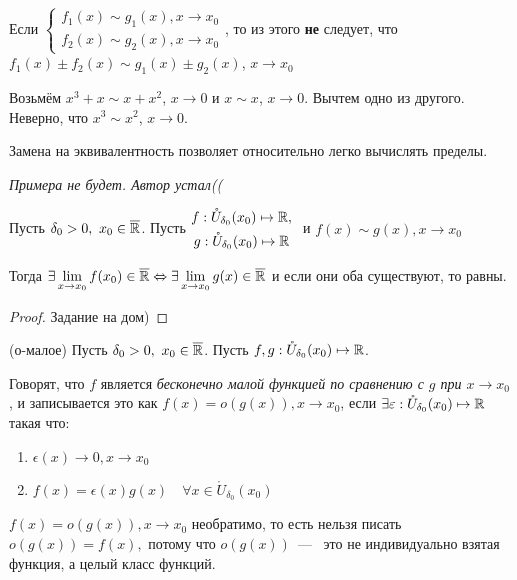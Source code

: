 \begin{note}
    Если $\left\{
    \begin{gathered}
        f_{1}(x) \sim g_{1}(x), x\to x_{0} \\
        f_{2}(x) \sim g_{2}(x), x\to x_{0}
    \end{gathered} \right.$, то из этого \textbf{не} следует, что $f_{1}(x) \pm f_{2} (x) \sim g_{1}(x) \pm g_{2} (x)$, $x\to x_{0}$
\end{note}

\begin{example}
    Возьмём $x^{3} + x \sim x + x^{2}$, $x \to 0$ и $x \sim x$, $x \to 0$. Вычтем одно из другого. Неверно, что  $x^{3}\sim x^{2}$, $x\to 0$.   
\end{example}

Замена на эквивалентность позволяет относительно легко вычислять пределы.

\textit{Примера не будет. Автор устал((}

\begin{lemma}
    Пусть $\delta_{0} > 0, \ x_{0} \in \overline{\mathbb{R}}$. Пусть $ \begin{gathered}
        f: \mathring{U}_{\delta_{0}}(x_{0}) \mapsto \mathbb{R}, \\
        g:\mathring{U}_{\delta_{0}}(x_{0}) \mapsto \mathbb{R}
    \end{gathered}\ $ и $f(x) \sim g(x), x\to x_{0}$ 

    Тогда $\exists \lim\limits_{x\to x_{0}} f(x_{0}) \in \overline{\mathbb{R}} \Leftrightarrow \exists \lim\limits_{x\to x_{0}} g(x)\in \overline{\mathbb{R}}$ и если они оба существуют, то равны.
\end{lemma}
\begin{proof}
    Задание на дом)
\end{proof}

\begin{definition}
    (о-малое) Пусть $\delta_{0} > 0, \ x_{0} \in \overline{\mathbb{R}}$. Пусть $f, g: \mathring{U}_{\delta_{0}}(x_{0}) \mapsto \mathbb{R}$.

    Говорят, что $f$ является \textit{бесконечно малой функцией по сравнению с $g$ при $x \to x_{0}$}, и записывается это как $f(x) = o(g(x)), x \to x_{0}$, если $\exists \varepsilon: \mathring{U}_{\delta_{0}}(x_{0}) \mapsto \mathbb{R}$ такая что:
    \begin{enumerate}
        \item $\epsilon(x) \to 0, x\to x_{0}$
        \item $f(x) = \epsilon(x)g(x) \quad \forall x \in \mathring{U}_{\delta_{0}}(x_{0})$
    \end{enumerate}
\end{definition}
\begin{note} 
    $f(x) = o(g(x)), x \to x_{0}$ необратимо, то есть нельзя писать $o(g(x)) = f(x),$ потому что $o(g(x))$~---~ это не индивидуально взятая функция, а целый класс функций. 
\end{note}

